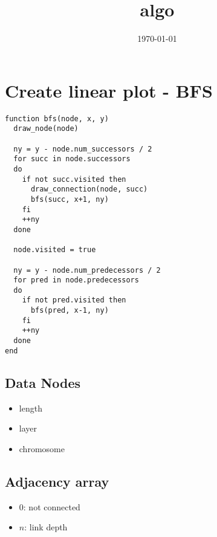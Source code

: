 \documentclass[11pt]{article}
\date{\today}
\title{algo}
\begin{document}
\maketitle
\tableofcontents


\section{Create linear plot - BFS}
\label{sec-1}

\begin{verbatim}
function bfs(node, x, y)
  draw_node(node)

  ny = y - node.num_successors / 2
  for succ in node.successors
  do
    if not succ.visited then
      draw_connection(node, succ)
      bfs(succ, x+1, ny)
    fi
    ++ny
  done

  node.visited = true

  ny = y - node.num_predecessors / 2
  for pred in node.predecessors
  do
    if not pred.visited then
      bfs(pred, x-1, ny)
    fi
    ++ny
  done
end
\end{verbatim}

\subsection{Data Nodes}
\label{sec-1-1}

\begin{itemize}
\item length
\item layer
\item chromosome
\end{itemize}

\subsection{Adjacency array}
\label{sec-1-2}

\begin{itemize}
\item $0$: not connected
\item $n$: link depth
\end{itemize}
\end{document}
